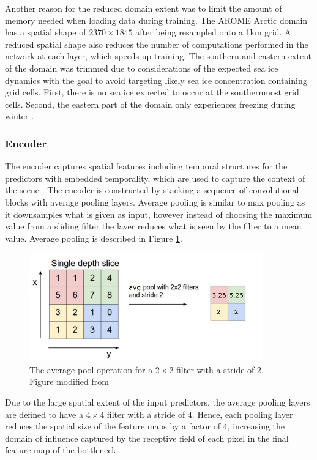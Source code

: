 \documentclass[../main/thesis]{subfiles}
\begin{document}
Another reason for the reduced domain extent was to limit the amount of memory needed when loading data during training. The AROME Arctic domain has a spatial shape of $2370 \times 1845$ after being resampled onto a 1km grid. A reduced spatial shape also reduces the number of computations performed in the network at each layer, which speeds up training. The southern and eastern extent of the domain was trimmed due to considerations of the expected sea ice dynamics with the goal to avoid targeting likely sea ice concentration containing grid cells. First, there is no sea ice expected to occur at the southernmost grid cells. Second, the eastern part of the domain only experiences freezing during winter \citep{Serreze2019}.

\subsubsection{Encoder}
The encoder captures spatial features including temporal structures for the predictors with embedded temporality, which are used to capture the context of the scene \citep{Ronneberger2015}. The encoder is constructed by stacking a sequence of convolutional blocks with average pooling layers. Average pooling is similar to max pooling as it downsamples what is given as input, however instead of choosing the maximum value from a sliding filter the layer reduces what is seen by the filter to a mean value. Average pooling is described in Figure \ref{fig:avgpool}.

\begin{figure}
    \centering
    \includegraphics[width=0.9\textwidth]{The-AvgPool-operation.png}
    \caption{\label{fig:avgpool}The average pool operation for a $2 \times 2$ filter with a stride of 2. Figure modified from \protect\citet{MihaiDaniel2020}}
\end{figure}

Due to the large spatial extent of the input predictors, the average pooling layers are defined to have a $4 \times 4$ filter with a stride of 4. Hence, each pooling layer reduces the spatial size of the feature maps by a factor of 4, increasing the domain of influence captured by the receptive field of each pixel in the final feature map of the bottleneck.
\end{document}
